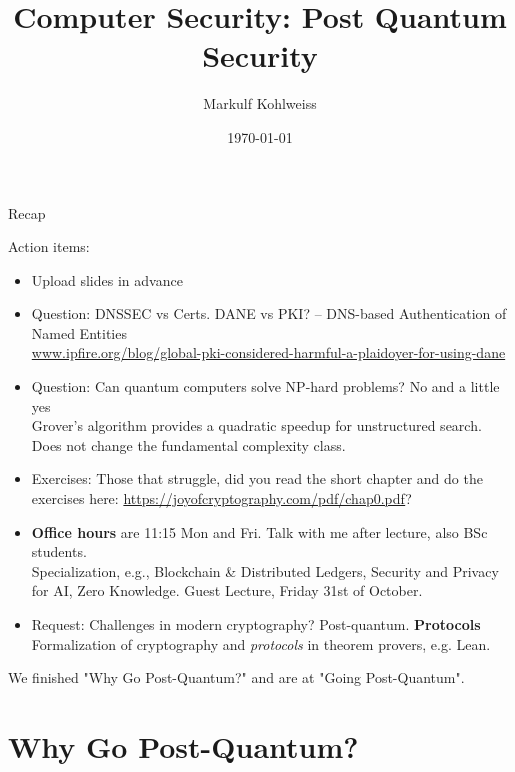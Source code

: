 \documentclass[aspectratio=169, lualatex]{beamer} %
\title{Computer Security: Post Quantum Security}
\author{Markulf Kohlweiss}
\institute{University of Edinburgh, School of Informatics}
\date{\today}
\def\envert#1{\textcolor{vert}{#1}}
\begin{document}
\begin{frame}[plain]
	\titlepage
\end{frame}

\begin{frame}{Recap}
	\vspace{-0.5cm}

  Action items:
  \begin{itemize}
  \item[$\checkmark$] Upload slides in advance
\item[?] Question: DNSSEC vs Certs. DANE vs PKI? \envert{\footnotesize-- DNS-based Authentication of Named Entities} \\ \pause
{\footnotesize\url{www.ipfire.org/blog/global-pki-considered-harmful-a-plaidoyer-for-using-dane}}\pause
  \item[?] Question: Can quantum computers solve NP-hard problems? \envert{No and a little yes} \\ {\footnotesize Grover's algorithm provides a quadratic speedup for unstructured search. \\ \envert{Does not change the fundamental complexity class.}} \pause 
  \item[?] Exercises: Those that struggle, did you read the short chapter and do the exercises here: \url{https://joyofcryptography.com/pdf/chap0.pdf}? \smallskip \pause
  \item[$\checkmark$] \textbf{Office hours} are 11:15 Mon and Fri. 
  {\footnotesize Talk with me after lecture, also BSc students. \\ 
Specialization, e.g., Blockchain \& Distributed Ledgers, Security and Privacy for AI, Zero Knowledge.} \envert{Guest Lecture, Friday 31st of October.}\pause
  \item[$\checkmark$] Request: Challenges in modern cryptography?  
  Post-quantum. \textbf{Protocols} \\ {\footnotesize Formalization of cryptography and \emph{protocols} in theorem provers, e.g. Lean.}
  \end{itemize}

  We finished "Why Go Post-Quantum?" and are at "Going Post-Quantum".

\end{frame}

\section{Why Go Post-Quantum?}
\end{document}
